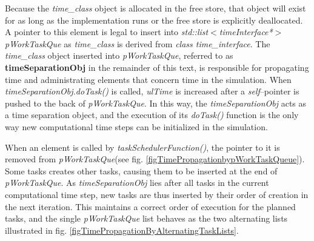 	Because the \emph{time\_class} object is allocated in the free store, that object will exist for as long as the implementation runs or the free store is explicitly deallocated\cite{Stroustrup2000KAP6}. %
	A pointer to this element is legal to insert into \emph{std::list$<$timeInterface*$>$ pWorkTaskQue} as \emph{time\_class} is derived from \emph{class time\_interface}.
	The \emph{time\_class} object inserted into \emph{pWorkTaskQue}, referred to as {\bf timeSeparationObj} in the remainder of this text, is responsible for propagating time and administrating elements that concern time in the simulation.
	When \emph{timeSeparationObj.doTask()} is called, \emph{ulTime} is increased after a \emph{self}--pointer is pushed to the back of \emph{pWorkTaskQue}\cite{FDP_report}.
	In this way, the \emph{timeSeparationObj} acts as a time separation object, and the execution of its \emph{doTask()} function is the only way new computational time steps can be initialized in the simulation.

	When an element is called by \emph{taskSchedulerFunction()}, the pointer to it is removed from \emph{pWorkTaskQue}(see fig. \ref{figTimePropagationbypWorkTaskQueue}). %
	Some tasks creates other tasks, causing them to be inserted at the end of \emph{pWorkTaskQue}. %
	As \emph{timeSeparationObj} lies after all tasks in the current computational time step, new tasks are thus inserted by their order of creation in the next iteration. %
	This maintains a correct order of execution for the planned tasks, and the single \emph{pWorkTaskQue} list behaves as the two alternating lists illustrated in fig. \ref{figTimePropagationByAlternatingTaskLists}.

